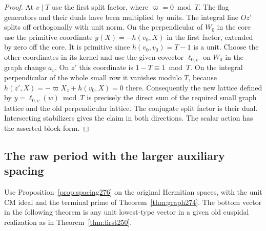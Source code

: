 \documentclass[a4paper,11pt]{article}
\theoremstyle{definition}
\theoremstyle{remark}
\numberwithin{equation}{section}
\begin{document}
\begin{proof}
At \(v\mid T\) use the first split factor, where \(\varpi=0\bmod T\).
The flag generators and their duals have been multiplied by
units. The integral line \(Oz'\) splits off orthogonally with
unit norm. On the perpendicular of \(W_0\) in the core use
the primitive coordinate \(y(X)=-h(v_0,X)\) in the first
factor, extended by zero off the core. It is primitive since
\(h(v_0,v_0)=T-1\) is a unit. Choose the other coordinates in
its kernel and use the given covector \(\ell_{0,v}\) on \(W_0\)
in the graph change \(a_v\). On \(z'\) this coordinate is
\(1-T\equiv1\bmod T\). On the integral perpendicular of
the whole small row it vanishes modulo \(T\), because
\(h(z',X)=-\varpi X_z+h(v_0,X)=0\) there. Consequently the
new lattice defined by \(y=\ell_{0,v}(w)\bmod T\) is precisely
the direct sum of the required small graph lattice and the
old perpendicular lattice. The conjugate split factor is
their dual. Intersecting stabilizers gives the claim in both
directions. The scalar action has the asserted block form.
\end{proof}

\subsection{The raw period with the larger auxiliary spacing}\label{nav:VI-47}
Use Proposition~\ref{prop:spacing276} on the original Hermitian
spaces, with the unit CM ideal and the terminal prime of
Theorem~\ref{thm:graph274}. The bottom vector in the following
theorem is any unit lowest-type vector in a given old cuspidal
realization as in Theorem~\ref{thm:first250}.
\end{document}
